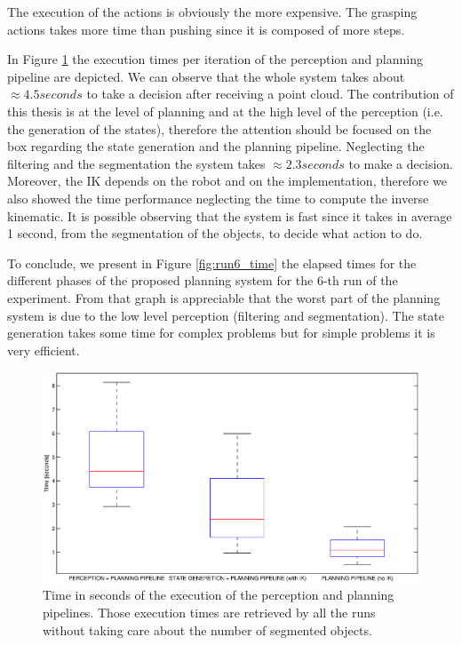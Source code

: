The execution of the actions is obviously the more expensive. The grasping actions takes more time than pushing since it is composed of more steps.

In Figure \ref{fig:pipeline} the execution times per iteration of the perception and planning pipeline are depicted. We can observe that the whole system takes about $\approx 4.5 seconds$ to take a decision after receiving a point cloud. The contribution of this thesis is at the level of planning and at the high level of the perception (i.e. the generation of the states), therefore the attention should be focused on the box regarding the state generation and the planning pipeline. Neglecting the filtering and the segmentation the system takes $\approx 2.3 seconds$ to make a decision. Moreover, the IK depends on the robot and on the implementation, therefore we also showed the time performance neglecting the time to compute the inverse kinematic. It is possible observing that the system is fast since it takes in average 1 second, from the segmentation of the objects, to decide what action to do. 

To conclude, we present in Figure \ref{fig:run6_time} the elapsed times for the different phases of the proposed planning system for the $6$-th run of the experiment. From that graph is appreciable that the worst part of the planning system is due to the low level perception (filtering and segmentation). The state generation takes some time for complex problems but for simple problems it is very efficient. 


\begin{figure}
\centering
\includegraphics[width=16cm]{Img/experiments/exp_good/data/pipeline.eps}
\caption{Time in seconds of the execution of the perception and planning pipelines. Those execution times are retrieved by all the runs without taking care about the number of segmented objects.}\label{fig:pipeline}
\end{figure}

